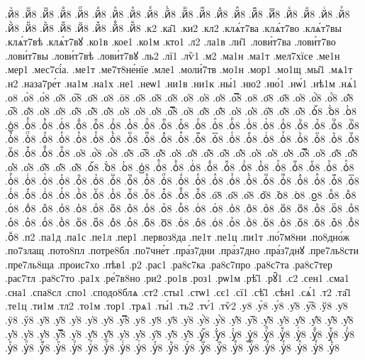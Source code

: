 {.йⷱ8
.йⷲ8
.йⷳ8
.йⷴ8
.йⷵ8
.йⷶ8
.йⷷ8
.йⷸ8
.йⷹ8
.йⷺ8
.йⷻ8
.йⷼ8
.йⷽ8
.йⷾ8
.йⷿ8
.й꙯8
.йꙴ8
.йꙵ8
.йꙶ8
.йꙷ8
.йꙸ8
.йꙹ8
.йꙺ8
.йꙻ8
.й꙼8
.й꙽8
.йꚞ8
.йꚟ8
.к2
.ка̑1
.ки2
.кл2
.клѧ́т7ва
.клѧ́т7во
.клѧ́т7вы
.клѧ́т7вѣ
.клѧ́т7вꙋ
.ко1в
.кое1
.ко1м
.кто1
.л2
.ла1в
.ли̑1
.лови́т7ва
.лови́т7во
.лови́т7вы
.лови́т7вѣ
.лови́т7вꙋ
.ль2
.лї1
.лѷ1
.м2
.ма1н
.ма1т
.мел7хїсе
.ме1н
.мер1
.мес7сі́а.
.ме1т
.ме7т8не́нїе
.мле1
.моли́7тв
.мо1н
.мор1
.мо1щ
.мы̑1
.мѧ1т
.н2
.наза7ре́т
.на1м
.на1х
.не1
.неѡ1
.ни1в
.ни1к
.ны́1
.ню2
.ню́1
.нѡ́1
.нѣ1м
.нѧ́1
.о8
.о̀8
.о́8
.о̂8
.о̅8
.о̆8
.о̇8
.ӧ8
.о̋8
.о̏8
.о̑8
.о̓8
.о̔8
.о̾8
.о̿8
.о͘8
.о҃8
.о҄8
.о҅8
.о҅̀8
.о҅́8
.о҅̂8
.о҅̅8
.о҅̆8
.о҅̇8
.о҅̈8
.о҅̋8
.о҅̏8
.о҅̑8
.о҅̓8
.о҅̔8
.о҅̾8
.о҅̿8
.о҅͘8
.о҅҃8
.о҅҄8
.о҅҅8
.о҅҆8
.о҅҇8
.о҅᷀8
.о҅᷁8
.о҅᷶8
.о᷷҅8
.о᷸҅8
.о᷹҅8
.о҅ⷠ8
.о҅ⷡ8
.о҅ⷢ8
.о҅ⷣ8
.о҅ⷤ8
.о҅ⷥ8
.о҅ⷦ8
.о҅ⷧ8
.о҅ⷨ8
.о҅ⷩ8
.о҅ⷪ8
.о҅ⷫ8
.о҅ⷬ8
.о҅ⷭ8
.о҅ⷮ8
.о҅ⷯ8
.о҅ⷰ8
.о҅ⷱ8
.о҅ⷲ8
.о҅ⷳ8
.о҅ⷴ8
.о҅ⷵ8
.о҅ⷶ8
.о҅ⷷ8
.о҅ⷸ8
.о҅ⷹ8
.о҅ⷺ8
.о҅ⷻ8
.о҅ⷼ8
.о҅ⷽ8
.о҅ⷾ8
.о҅ⷿ8
.о҅꙯8
.о҅ꙴ8
.о҅ꙵ8
.о҅ꙶ8
.о҅ꙷ8
.о҅ꙸ8
.о҅ꙹ8
.о҅ꙺ8
.о҅ꙻ8
.о҅꙼8
.о҅꙽8
.о҅ꚞ8
.о҅ꚟ8
.о҆8
.о҆̀8
.о҆́8
.о҆̂8
.о҆̅8
.о҆̆8
.о҆̇8
.о҆̈8
.о҆̋8
.о҆̏8
.о҆̑8
.о҆̓8
.о҆̔8
.о҆̾8
.о҆̿8
.о҆͘8
.о҆҃8
.о҆҄8
.о҆҅8
.о҆҆8
.о҆҇8
.о҆᷀8
.о҆᷁8
.о҆᷶8
.о᷷҆8
.о᷸҆8
.о᷹҆8
.о҆ⷠ8
.о҆ⷡ8
.о҆ⷢ8
.о҆ⷣ8
.о҆ⷤ8
.о҆ⷥ8
.о҆ⷦ8
.о҆ⷧ8
.о҆ⷨ8
.о҆ⷩ8
.о҆ⷪ8
.о҆ⷫ8
.о҆ⷬ8
.о҆ⷭ8
.о҆ⷮ8
.о҆ⷯ8
.о҆ⷰ8
.о҆ⷱ8
.о҆ⷲ8
.о҆ⷳ8
.о҆ⷴ8
.о҆ⷵ8
.о҆ⷶ8
.о҆ⷷ8
.о҆ⷸ8
.о҆ⷹ8
.о҆ⷺ8
.о҆ⷻ8
.о҆ⷼ8
.о҆ⷽ8
.о҆ⷾ8
.о҆ⷿ8
.о҆꙯8
.о҆ꙴ8
.о҆ꙵ8
.о҆ꙶ8
.о҆ꙷ8
.о҆ꙸ8
.о҆ꙹ8
.о҆ꙺ8
.о҆ꙻ8
.о҆꙼8
.о҆꙽8
.о҆ꚞ8
.о҆ꚟ8
.о҇8
.о᷀8
.о᷁8
.о᷶8
.о᷷8
.о᷸8
.о᷹8
.оⷠ8
.оⷡ8
.оⷢ8
.оⷣ8
.оⷤ8
.оⷥ8
.оⷦ8
.оⷧ8
.оⷨ8
.оⷩ8
.оⷪ8
.оⷫ8
.оⷬ8
.оⷭ8
.оⷮ8
.оⷯ8
.оⷰ8
.оⷱ8
.оⷲ8
.оⷳ8
.оⷴ8
.оⷵ8
.оⷶ8
.оⷷ8
.оⷸ8
.оⷹ8
.оⷺ8
.оⷻ8
.оⷼ8
.оⷽ8
.оⷾ8
.оⷿ8
.о꙯8
.оꙴ8
.оꙵ8
.оꙶ8
.оꙷ8
.оꙸ8
.оꙹ8
.оꙺ8
.оꙻ8
.о꙼8
.о꙽8
.оꚞ8
.оꚟ8
.п2
.па1д
.па1с
.пе1л
.пер1
.первоз8да
.пе1т
.пе1ц
.пи1т
.по́7м8ни
.по8дно́ж
.по7злащ
.пото8пл
.потре8бл
.по7чне́т
.пра́з7дни
.пра́з7дно
.пра́з7днꙋ
.пре7ль8сти
.пре7ль8ща
.проис7хо
.пѣв1
.р2
.рас1
.ра8с7ка
.ра8с7про
.ра8с7та
.ра8с7тер
.рас7тл
.ра8с7то
.ра1х
.ре́7в8но
.ри2
.ро1в
.роз1
.рѡ1м
.рѣ̑1
.рꙋ̑1
.с2
.сен1
.сма1
.сна1
.спа8сл
.спо1
.сподо8блѧ
.ст2
.сты1
.стѡ1
.сє1
.сї1
.сѣ̑1
.сѣн1
.сѧ́1
.т2
.та̑1
.те1ц
.ти1м
.тл2
.то1м
.тор1
.трѧ1
.ты́1
.ть2
.тѵ́1
.тѷ2
.у8
.у̀8
.у́8
.у̂8
.у̅8
.ў8
.у̇8
.ӱ8
.ӳ8
.у̏8
.у̑8
.у̓8
.у̔8
.у̾8
.у̿8
.у͘8
.у҃8
.у҄8
.у҅8
.у҅̀8
.у҅́8
.у҅̂8
.у҅̅8
.у҅̆8
.у҅̇8
.у҅̈8
.у҅̋8
.у҅̏8
.у҅̑8
.у҅̓8
.у҅̔8
.у҅̾8
.у҅̿8
.у҅͘8
.у҅҃8
.у҅҄8
.у҅҅8
.у҅҆8
.у҅҇8
.у҅᷀8
.у҅᷁8
.у҅᷶8
.у᷷҅8
.у᷸҅8
.у᷹҅8
.у҅ⷠ8
.у҅ⷡ8
.у҅ⷢ8
.у҅ⷣ8
.у҅ⷤ8
.у҅ⷥ8
.у҅ⷦ8
.у҅ⷧ8
.у҅ⷨ8
.у҅ⷩ8
.у҅ⷪ8
.у҅ⷫ8
.у҅ⷬ8
.у҅ⷭ8
.у҅ⷮ8
.у҅ⷯ8
.у҅ⷰ8
.у҅ⷱ8
.у҅ⷲ8
.у҅ⷳ8
.у҅ⷴ8
.у҅ⷵ8
.у҅ⷶ8
.у҅ⷷ8
.у҅ⷸ8
.у҅ⷹ8
.у҅ⷺ8
}
